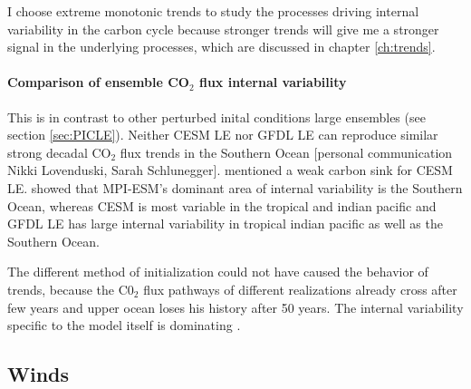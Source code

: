 \documentclass[12pt]{article}
\begin{document}
I choose extreme monotonic trends to study the processes driving internal variability in the carbon cycle because stronger trends will give me a stronger signal in the underlying processes, which are discussed in chapter \ref{ch:trends}. %



\paragraph{Comparison of ensemble CO$_2$ flux internal variability} This is in contrast to other perturbed inital conditions large ensembles (see section \ref{sec:PICLE}). Neither CESM LE nor GFDL LE can reproduce similar strong decadal CO$_2$ flux trends in the Southern Ocean [personal communication Nikki Lovenduski, Sarah Schlunegger]. \cite{McKinley2016} mentioned a weak carbon sink for CESM LE. \cite{Resplandy2015} showed that MPI-ESM's dominant area of internal variability is the Southern Ocean, whereas CESM is most variable in the tropical and indian pacific and GFDL LE has large internal variability in tropical indian pacific as well as the Southern Ocean.

The different method of initialization could not have caused the behavior of trends, because the C0$_2$ flux pathways of different realizations already cross after few years and upper ocean loses his history after 50 years. The internal variability specific to the model itself is dominating \citep{Lovenduski2016}.  







\clearpage
\subsection{Winds}
\label{sec:winds_model_eval}
\end{document}
